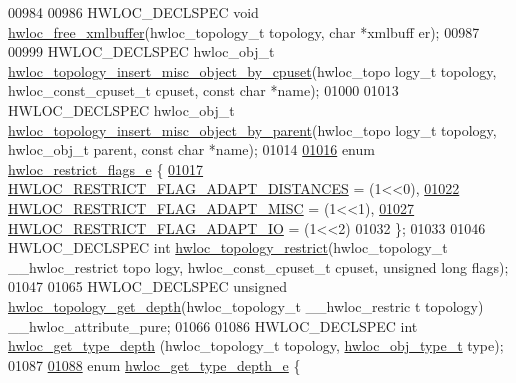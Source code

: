 \begin{DoxyCode}
00984 
00986 HWLOC\_DECLSPEC \textcolor{keywordtype}{void} \hyperlink{a00045_ga5e375acef034bebc1f20ead884697301}{hwloc_free_xmlbuffer}(hwloc\_topology\_t topology, \textcolor{keywordtype}{char} *xmlbuff
      er);
00987 
00999 HWLOC\_DECLSPEC hwloc\_obj\_t \hyperlink{a00045_ga017a9ba16d554326c6e3812d545d7230}{hwloc_topology_insert_misc_object_by_cpuset}(hwloc\_topo
      logy\_t topology, hwloc\_const\_cpuset\_t cpuset, \textcolor{keyword}{const} \textcolor{keywordtype}{char} *name);
01000 
01013 HWLOC\_DECLSPEC hwloc\_obj\_t \hyperlink{a00045_gadacd7a3d21220fbb30c3256d8b22a294}{hwloc_topology_insert_misc_object_by_parent}(hwloc\_topo
      logy\_t topology, hwloc\_obj\_t parent, \textcolor{keyword}{const} \textcolor{keywordtype}{char} *name);
01014 
\hypertarget{a00033_source_l01016}{}\hyperlink{a00045_ga9d80f08eb25b7ac22f1b998dc8bf521f}{01016} \textcolor{keyword}{enum} \hyperlink{a00045_ga9d80f08eb25b7ac22f1b998dc8bf521f}{hwloc_restrict_flags_e} \{
\hypertarget{a00033_source_l01017}{}\hyperlink{a00045_gga9d80f08eb25b7ac22f1b998dc8bf521fa4d18407f5520793b50b9e892f5bb55d1}{01017}   \hyperlink{a00045_gga9d80f08eb25b7ac22f1b998dc8bf521fa4d18407f5520793b50b9e892f5bb55d1}{HWLOC_RESTRICT_FLAG_ADAPT_DISTANCES} = (1<<0),
\hypertarget{a00033_source_l01022}{}\hyperlink{a00045_gga9d80f08eb25b7ac22f1b998dc8bf521fa699969227a09bbc1a7de51dc9fb7be4b}{01022}   \hyperlink{a00045_gga9d80f08eb25b7ac22f1b998dc8bf521fa699969227a09bbc1a7de51dc9fb7be4b}{HWLOC_RESTRICT_FLAG_ADAPT_MISC} = (1<<1),
\hypertarget{a00033_source_l01027}{}\hyperlink{a00045_gga9d80f08eb25b7ac22f1b998dc8bf521faa95d6985e36ec1e55f68b210297a85cb}{01027}   \hyperlink{a00045_gga9d80f08eb25b7ac22f1b998dc8bf521faa95d6985e36ec1e55f68b210297a85cb}{HWLOC_RESTRICT_FLAG_ADAPT_IO} = (1<<2)
01032 \};
01033 
01046 HWLOC\_DECLSPEC \textcolor{keywordtype}{int} \hyperlink{a00045_gad75fa918e3eb54663bdeab25ed89b648}{hwloc_topology_restrict}(hwloc\_topology\_t \_\_hwloc\_restrict topo
      logy, hwloc\_const\_cpuset\_t cpuset, \textcolor{keywordtype}{unsigned} \textcolor{keywordtype}{long} flags);
01047 
01065 HWLOC\_DECLSPEC \textcolor{keywordtype}{unsigned} \hyperlink{a00046_ga8c30b0cec55074eb3ed34e4f2a1a9937}{hwloc_topology_get_depth}(hwloc\_topology\_t \_\_hwloc\_restric
      t topology) \_\_hwloc\_attribute\_pure;
01066 
01086 HWLOC\_DECLSPEC \textcolor{keywordtype}{int} \hyperlink{a00046_gaea7c64dd59467f5201ba87712710b14d}{hwloc_get_type_depth} (hwloc\_topology\_t topology, 
      \hyperlink{a00041_gacd37bb612667dc437d66bfb175a8dc55}{hwloc_obj_type_t} type);
01087 
\hypertarget{a00033_source_l01088}{}\hyperlink{a00046_gaf4e663cf42bbe20756b849c6293ef575}{01088} \textcolor{keyword}{enum} \hyperlink{a00046_gaf4e663cf42bbe20756b849c6293ef575}{hwloc_get_type_depth_e} \{

\end{DoxyCode}
